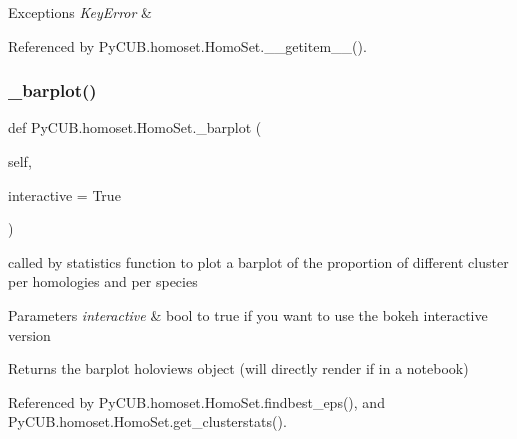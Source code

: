 \begin{DoxyExceptions}{Exceptions}
{\em Key\+Error} & \\
\hline
\end{DoxyExceptions}


Referenced by Py\+C\+U\+B.\+homoset.\+Homo\+Set.\+\_\+\+\_\+getitem\+\_\+\+\_\+().

\mbox{\label{class_py_c_u_b_1_1homoset_1_1_homo_set_af6e8927ae33e2785ab21293a59628946}} 
\subsubsection{\texorpdfstring{\+\_\+barplot()}{\_barplot()}}
{\footnotesize\ttfamily def Py\+C\+U\+B.\+homoset.\+Homo\+Set.\+\_\+barplot (\begin{DoxyParamCaption}\item[{}]{self,  }\item[{}]{interactive = {\ttfamily True} }\end{DoxyParamCaption})\hspace{0.3cm}{\ttfamily [private]}}



called by statistics function to plot a barplot of the proportion of different cluster per homologies and per species 


\begin{DoxyParams}{Parameters}
{\em interactive} & bool to true if you want to use the bokeh interactive version \\
\hline
\end{DoxyParams}
\begin{DoxyReturn}{Returns}
the barplot holoviews object (will directly render if in a notebook) 
\end{DoxyReturn}


Referenced by Py\+C\+U\+B.\+homoset.\+Homo\+Set.\+findbest\+\_\+eps(), and Py\+C\+U\+B.\+homoset.\+Homo\+Set.\+get\+\_\+clusterstats().

\mbox{\label{class_py_c_u_b_1_1homoset_1_1_homo_set_afd51ea6276ecae41960d426ce72755b0}} 
